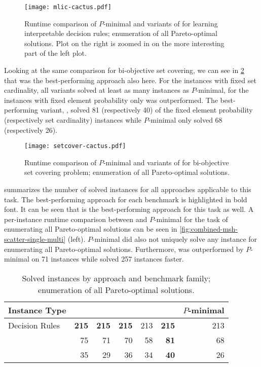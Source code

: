 \begin{figure}
  \centering
  \texttt{[image: mlic-cactus.pdf]}
  \caption{Runtime comparison of $P$-minimal and variants of \algname{} for learning interpretable decision rules;
    enumeration of all Pareto-optimal solutions.
    Plot on the right is zoomed in on the more interesting part of the left plot.
  }\label{fig:mlic-cactus-multi}
\end{figure}

Looking at the same comparison for bi-objective set covering, we can see in \cref{fig:setcover-cactus-multi} that \msh{} was the best-performing approach also here.
For the instances with fixed set cardinality, all \algname{} variants solved at least as many instances as $P$-minimal, for the instances with fixed element probability only \oll{} was outperformed.
The best-performing variant, \msh{}, solved 81 (respectively 40) of the fixed element probability (respectively set cardinality) instances while $P$-minimal only solved 68 (respectively 26).

\begin{figure}
  \centering
  \texttt{[image: setcover-cactus.pdf]}
  \caption{Runtime comparison of $P$-minimal and variants of \algname{} for bi-objective set covering problem;
    enumeration of all Pareto-optimal solutions.
  }\label{fig:setcover-cactus-multi}
\end{figure}

 summarizes the number of solved instances for all approaches applicable to this task.
The best-performing approach for each benchmark is highlighted in bold font.
It can be seen that \msh{} is the best-performing approach for this task as well.
A per-instance runtime comparison between \msh{} and $P$-minimal for the task of enumerating all Pareto-optimal solutions can be seen in \cref{fig:combined-msh-scatter-single-multi} (left).
$P$-minimal did also not uniquely solve any instance for enumerating all Pareto-optimal solutions.
Furthermore, \msh{} was outperformed by $P$-minimal on 71 instances while \msh{} solved 257 instances faster.

\begin{table}
  \centering
  \caption{Solved instances by approach and benchmark family;
    enumeration of all Pareto-optimal solutions.
  }\label{tab:nsolved-multi}
  \begin{tabular}{@{}lrrrrrr@{}}
    \toprule
    Instance Type & \satunsat{} & \unsatsat{} & \msu{} & \oll{} & \msh{} & $P$-minimal \\
    \midrule
    Decision Rules & \textbf{215} & \textbf{215} & \textbf{215} & 213 & \textbf{215} & 213 \\
    \scep{} & 75 & 71 & 70 & 58 & \textbf{81} & 68 \\
    \scsc{} & 35 & 29 & 36 & 34 & \textbf{40} & 26 \\
    \bottomrule
  \end{tabular}
\end{table}

